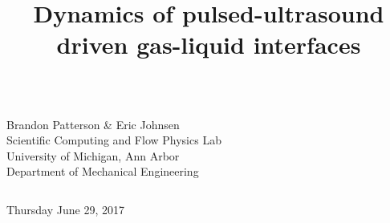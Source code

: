\title[]{Dynamics of pulsed-ultrasound\\driven gas-liquid interfaces}
\author[] {}

\institute[]{}
\date[date]{}


\begin{frame} %
\titlepage \vspace{-2.50cm}
\centering
\begin{columns}

 \begin{center}
%
\normalsize{Brandon Patterson \& Eric Johnsen} \vspace{12pt} \\ 
%
\footnotesize{Scientific Computing and Flow Physics Lab} \vspace{4pt}\\
\footnotesize{University of Michigan, Ann Arbor} \vspace{4pt} \\
\scriptsize{Department of Mechanical Engineering} \vspace{4pt} \\
\end{center}
\vspace*{.15cm}
\end{columns}
\begin{center}
%
%
\footnotesize {Thursday June 29, 2017} \vspace{-.1cm}
%
%
\end{center}




\end{frame}

